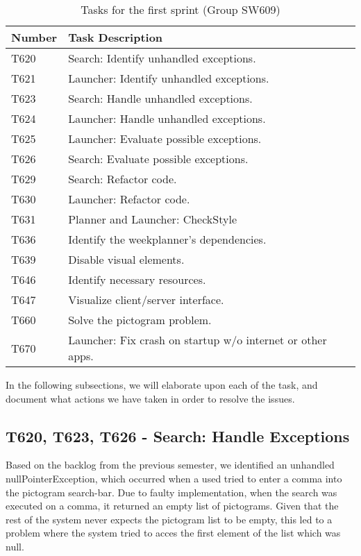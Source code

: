 \begin{table}[H]
\centering
\begin{tabular}{|l|l|}
\hline
Number 			& Task Description 											\\\hline
T620  			& Search: Identify unhandled exceptions.                 	\\\hline
T621    	   	& Launcher: Identify unhandled exceptions. 					\\\hline 
T623	       	& Search: Handle unhandled exceptions.                 		\\\hline
T624    	   	& Launcher: Handle unhandled exceptions.  					\\\hline
T625   	   		& Launcher: Evaluate possible exceptions.        			\\\hline
T626   	   		& Search: Evaluate possible exceptions.                		\\\hline
T629  	   		& Search: Refactor code.			   						\\\hline
T630       		& Launcher: Refactor code.                 					\\\hline
T631       		& Planner and Launcher: CheckStyle                 			\\\hline
T636			& Identify the weekplanner's dependencies.					\\\hline
T639       		& Disable visual elements.                 					\\\hline
T646       		& Identify necessary resources.                 			\\\hline
T647       		& Visualize client/server interface.                 		\\\hline 
T660       		& Solve the pictogram problem.                 				\\\hline
T670       		& Launcher: Fix crash on startup w/o internet or other apps.\\\hline
\end{tabular}
\label{S01:Tasks}  
\caption{Tasks for the first sprint (Group SW609)}
\end{table}

In the following subsections, we will elaborate upon each of the task, and
document what actions we have taken in order to resolve the issues.

\subsection{T620, T623, T626 - Search: Handle Exceptions}
Based on the backlog from the previous semester, we identified an unhandled
nullPointerException, which occurred when a used tried to enter a comma into the
pictogram search-bar. Due to faulty implementation, when the search was executed
on a comma, it returned an empty list of pictograms. Given that the rest of the
system never expects the pictogram list to be empty, this led to a problem where
the system tried to acces the first element of the list which was null.\nl

